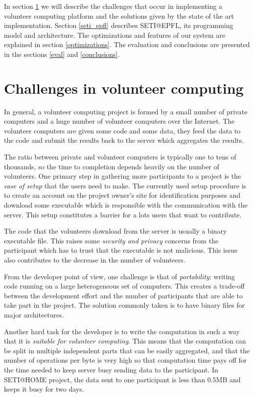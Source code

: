 \documentclass[letterpaper,twocolumn,10pt]{article}
\begin{document}
In section \ref{design} we will describe the challenges that occur in
implementing a volunteer computing platform and the solutions given by the state
of the art implementation. Section \ref{seti_epfl} describes SETI@EPFL,
its programming model and architecture. The optimizations and features of our 
system are explained in section \ref{optimizations}. The evaluation and
conclusions are presented in the sections \ref{eval} and \ref{conclusions}.

\section{Challenges in volunteer computing} \label{design}

In general, a volunteer computing project is formed by a small number of
private computers and a huge number of volunteer computers over the Internet.
The volunteer computers are given some code and some data, they feed the data to
the code and submit the results back to the server which aggregates the results.

The ratio between private and volunteer computers is typically one to tens of
thousands, so the time to completion depends heavily on the number of
volunteers. One primary step in gathering more participants to a project is the
{\it ease of setup} that the users need to make. The currently used setup
procedure is to create an account on the project owner's site for identification
purposes and download some executable which is responsible with the
communication with the server. This setup constitutes a barrier for a lots
users that want to contribute.

The code that the volunteers download from the server is usually a binary
executable file. This raises some {\it security and privacy} concerns from the
participant which has to trust that the executable is not malicious. This issue
also contributes to the decrease in the number of volunteers.

From the developer point of view, one challenge is that of {\it portability}:
writing code running on a large heterogeneous set of computers. This creates a 
trade-off between the  development effort and the number of participants that are
able to take part in the project. The solution commonly taken is to have binary
files for major architectures.

Another hard task for the developer is to write the computation in such a way
that it is {\it suitable for volunteer computing}. This means that the computation 
can be split in multiple independent parts that can be easily aggregated, and
that the number of operations per byte is very high so that computation time
pays off for the time needed to keep server busy sending data to the
participant. In SETI@HOME project, the data sent to one participant is less
than 0.5MB and keeps it busy for two days.
\end{document}
